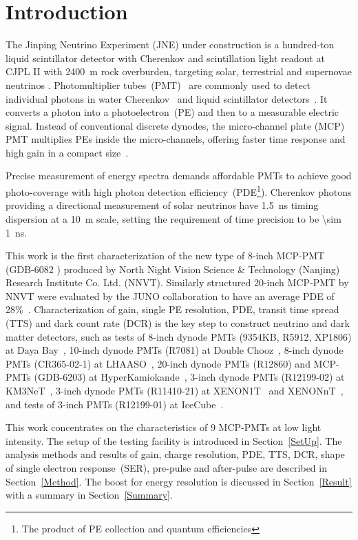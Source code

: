 \section{Introduction}
The Jinping Neutrino Experiment (JNE) under construction is a hundred-ton liquid scintillator detector with Cherenkov and scintillation light readout
 at CJPL II with \SI{2400}{m} rock overburden, targeting solar, terrestrial and supernovae neutrinos \cite{LetterJNE2017,xu_jinping_2020,xu_innovations_2022,xu_design_2022}.
Photomultiplier tubes~(PMT)~\cite{HAMAMATSUManual} are commonly used to detect individual photons in water Cherenkov~\cite{SNO,SuperK} and liquid scintillator detectors~\cite{KamLAND,JUNO:2015zny}. It converts a photon into a photoelectron~(PE) and then to a measurable electric signal.  Instead of conventional discrete dynodes, the micro-channel plate (MCP) PMT multiplies PEs inside the micro-channels, offering faster time response and high gain in a compact size~\cite{WANG2012113,MCP-PMTworkgroup:2021hoy,HAMAMATSUManual}.

Precise measurement of energy spectra demands affordable PMTs to achieve good photo-coverage with high photon detection efficiency~(PDE\footnote{The product of PE collection and quantum efficiencies}). Cherenkov photons providing a directional measurement of solar neutrinos have \SI{1.5}{ns} timing dispersion at a \SI{10}{m} scale, setting the requirement of time precision to be \SI{\sim 1}{ns}.


This work is the first characterization of
 the new type of 8-inch MCP-PMT (GDB-6082 \cite{GDB-6082}) produced by North Night Vision Science \& Technology (Nanjing) Research Institute Co. Ltd. (NNVT). %
Similarly structured 20-inch MCP-PMT by NNVT were evaluated by the JUNO collaboration to have an average PDE of 28\%~\cite{JUNOMassTesting}.
Characterization of gain, single PE resolution, PDE, transit time spread (TTS) and dark count rate (DCR) is the key step to construct neutrino and dark matter detectors, such as tests of
 8-inch dynode PMTs (9354KB, R5912, XP1806) at Daya Bay~\cite{DayaBayTesting}, 10-inch dynode PMTs (R7081) at Double Chooz~\cite{DoubleChoozeTesting}, 8-inch dynode PMTs (CR365-02-1) at LHAASO~\cite{LHAASOTesting}, 20-inch dynode PMTs (R12860) and MCP-PMTs (GDB-6203) at HyperKamiokande~\cite{HyperKTesting}, 3-inch dynode PMTs (R12199-02) at KM3NeT~\cite{KM3NetTesting}, 3-inch dynode PMTs (R11410-21) at XENON1T~\cite{XENON1TTesting} and XENONnT~\cite{XENONnTTesting}, and tests of 3-inch PMTs (R12199-01) at IceCube~\cite{IceCubeTesting}.

This work concentrates on the characteristics of 9 MCP-PMTs at low light intensity. The setup of the testing facility is introduced in Section~\ref{SetUp}. The analysis methods and results of gain, charge resolution, PDE, TTS, DCR, shape of single electron response~(SER), pre-pulse and after-pulse are described in Section~\ref{Method}. The boost for energy resolution is discussed in Section~\ref{Result} with a summary in Section~\ref{Summary}.
